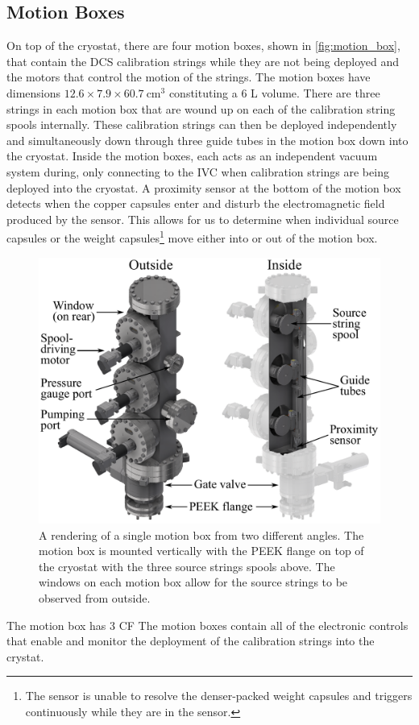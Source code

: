 \subsection*{Motion Boxes}
On top of the cryostat, there are four motion boxes, shown in \autoref{fig:motion_box}, that contain the DCS calibration strings while they are not being deployed and the motors that control the motion of the strings.
The motion boxes have dimensions $12.6\times7.9\times60.7~\textrm{cm}^3$ constituting a 6 L volume.
There are three strings in each motion box that are wound up on each of the calibration string spools internally.
These calibration strings can then be deployed independently and simultaneously down through three guide tubes in the motion box down into the cryostat.
Inside the motion boxes, each acts as an independent vacuum system during, only connecting to the IVC when calibration strings are being deployed into the cryostat.
A proximity sensor at the bottom of the motion box detects when the copper capsules enter and disturb the electromagnetic field produced by the sensor.
This allows for us to determine when individual source capsules or the weight capsules\footnote{The sensor is unable to resolve the denser-packed weight capsules and triggers continuously while they are in the sensor.} move either into or out of the motion box.
\begin{figure}[htpb]
\includegraphics[width=0.9\linewidth]{Figures/motion_box.pdf}
\caption[A rendering of a single motion box from two different angles.]{A rendering of a single motion box from two different angles. The motion box is mounted vertically with the PEEK flange on top of the cryostat with the three source strings spools above. The windows on each motion box allow for the source strings to be observed from outside.}
\label{fig:motion_box}
\end{figure}
The motion box has 3 CF
The motion boxes contain all of the electronic controls that enable and monitor the deployment of the calibration strings into the crystat.

